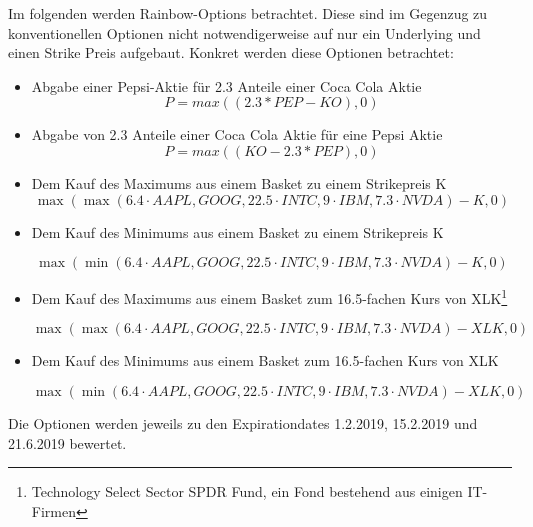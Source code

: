 \documentclass[12pt]{article}
\begin{document}
	Im folgenden werden Rainbow-Options betrachtet. Diese sind im Gegenzug zu konventionellen Optionen nicht notwendigerweise auf nur ein Underlying und einen Strike Preis aufgebaut.
	\newline
	Konkret werden diese Optionen betrachtet:
	\begin{itemize}
		\item Abgabe einer Pepsi-Aktie für 2.3 Anteile einer Coca Cola Aktie
		\begin{equation*}
		P=max((2.3*PEP-KO),0)
		\end{equation*}	
		\item Abgabe von 2.3 Anteile einer Coca Cola Aktie für eine Pepsi Aktie
		\begin{equation*}
		P=max((KO-2.3*PEP),0)
		\end{equation*}	
		\item Dem Kauf des Maximums aus einem Basket zu einem Strikepreis K
		\begin{equation*}
		\max(\max(6.4 \cdot AAPL,GOOG,22.5 \cdot INTC, 9 \cdot IBM, 7.3 \cdot NVDA)-K,0)
		\end{equation*}
		\item Dem Kauf des Minimums aus einem Basket zu einem Strikepreis K
		
		\begin{equation*}
		\max(\min(6.4 \cdot AAPL,GOOG,22.5 \cdot INTC, 9 \cdot IBM, 7.3 \cdot NVDA)-K,0)
		\end{equation*}
		\item Dem Kauf des Maximums aus einem Basket zum 16.5-fachen Kurs von XLK\footnote{Technology Select Sector SPDR Fund, ein Fond bestehend aus einigen IT-Firmen}
		
		\begin{equation*}
		\max(\max(6.4 \cdot AAPL,GOOG,22.5 \cdot INTC, 9 \cdot IBM, 7.3 \cdot NVDA)-XLK,0)
		\end{equation*}
		\item Dem Kauf des Minimums aus einem Basket zum 16.5-fachen Kurs von XLK
		
		\begin{equation*}
		\max(\min(6.4 \cdot AAPL,GOOG,22.5 \cdot INTC, 9 \cdot IBM, 7.3 \cdot NVDA)-XLK,0)
		\end{equation*}
		
		
	\end{itemize}
	
	Die Optionen werden jeweils zu den Expirationdates 1.2.2019, 15.2.2019 und 21.6.2019 bewertet.
\end{document}
